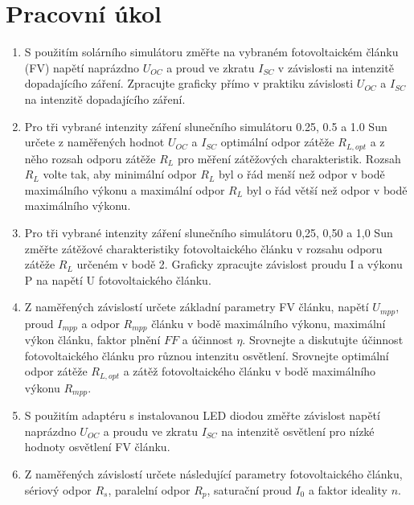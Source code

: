 \documentclass{../concepts/prepareprotokol} %
\begin{document}
\maketitle

\section{Pracovní úkol}
\begin{enumerate}
    \item S použitím solárního simulátoru změřte na vybraném fotovoltaickém článku (FV) napětí naprázdno $U_{OC}$ a proud ve zkratu $I_{SC}$ v závislosti na intenzitě dopadajícího záření. Zpracujte graficky přímo v praktiku závislosti $U_{OC}$ a $I_{SC}$ na intenzitě dopadajícího záření.

    \item Pro tři vybrané intenzity záření slunečního simulátoru 0.25, 0.5 a 1.0 Sun určete z naměřených hodnot $U_{OC}$ a $I_{SC}$ optimální odpor zátěže $R_{L,opt}$ a z něho rozsah odporu zátěže $R_L$ pro měření zátěžových charakteristik. Rozsah $R_L$ volte tak, aby minimální odpor $R_L$ byl o řád menší než odpor v bodě maximálního výkonu a maximální odpor $R_L$ byl o řád větší než odpor v bodě maximálního výkonu.

    \item Pro tři vybrané intenzity záření slunečního simulátoru 0,25, 0,50 a 1,0 Sun změřte zátěžové charakteristiky fotovoltaického článku v rozsahu odporu zátěže $R_L$ určeném v bodě 2. Graficky zpracujte závislost proudu I a výkonu P na napětí U fotovoltaického článku.

    \item Z naměřených závislostí určete základní parametry FV článku, napětí $U_{mpp}$, proud $I_{mpp}$ a odpor $R_{mpp}$ článku v bodě maximálního výkonu, maximální výkon článku, faktor plnění $FF$ a účinnost $\eta$. Srovnejte a diskutujte účinnost fotovoltaického článku pro různou intenzitu osvětlení. Srovnejte optimální odpor zátěže $R_{L,opt}$ a zátěž fotovoltaického článku v bodě maximálního výkonu $R_{mpp}$.

    \item S použitím adaptéru s instalovanou LED diodou změřte závislost napětí naprázdno $U_{OC}$ a proudu ve zkratu $I_{SC}$ na intenzitě osvětlení pro nízké hodnoty osvětlení FV článku.

    \item Z naměřených závislostí určete následující parametry fotovoltaického článku, sériový odpor $R_s$, paralelní odpor $R_p$, saturační proud $I_0$ a faktor ideality $n$.
\end{enumerate}
\end{document}
